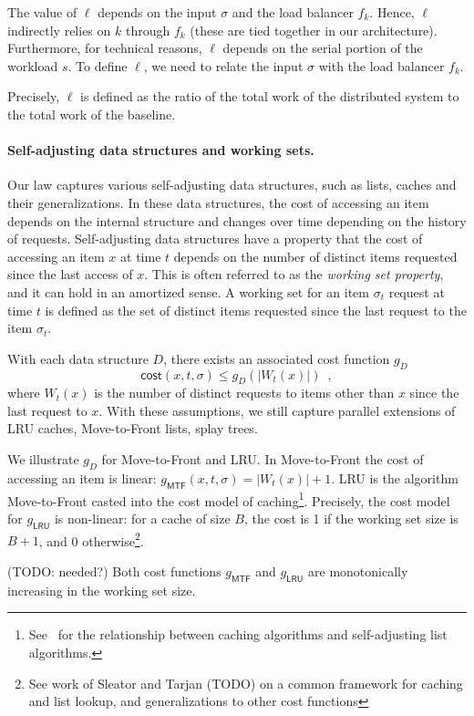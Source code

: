 The value of $\ell$ depends on the input $\sigma$ and the load balancer $f_k$. Hence, $\ell$ indirectly relies on $k$ through $f_k$ (these are tied together in our architecture). Furthermore, for technical reasons, $\ell$ depends on the serial portion of the workload $s$.
To define $\ell$, we need to relate the input $\sigma$ with the load balancer $f_k$.


Precisely, $\ell$ is defined as the ratio of the total work of the distributed system to the total work of the baseline.

\paragraph*{Self-adjusting data structures and working sets.}
Our law captures various self-adjusting data structures, such as lists, caches and their generalizations.
In these data structures, the cost of accessing an item depends on the internal structure and changes over time depending on the history of requests.
Self-adjusting data structures have a property that the cost of accessing an item $x$ at time $t$ depends on the number of distinct items requested since the last access of $x$.
This is often referred to as the \emph{working set property}, and it can hold in an amortized sense.
A working set for an item $\sigma_t$ request at time $t$ is defined as the set of distinct items requested since the last request to the item $\sigma_t$.

With each data structure $D$, there exists an associated cost function $g_D$ 
\[
	\textsf{cost}(x, t, \sigma) \le g_D(|W_t(x)|) \enspace ,
\]
where $W_t(x)$ is the number of distinct requests to items other than $x$ since the last request to $x$.
With these assumptions, we still capture parallel extensions of LRU caches, Move-to-Front lists, splay trees. 

We illustrate $g_D$ for Move-to-Front and LRU. In Move-to-Front the cost of accessing an item is linear: $g_\textsf{MTF}(x,t,\sigma) = |W_t(x)| + 1$.  LRU is the algorithm Move-to-Front casted into the cost model of caching\footnote{See~\cite{SleatorT85} for the relationship between caching algorithms and self-adjusting list algorithms.}. Precisely, the cost model for $g_\textsf{LRU}$ is non-linear: for a cache of size $B$, the cost is 1 if the working set size is $B+1$, and 0 otherwise\footnote{See work of Sleator and Tarjan (TODO) on a common framework for caching and list lookup, and generalizations to other cost functions}.

(TODO: needed?)
Both cost functions $g_\textsf{MTF}$ and $g_\textsf{LRU}$ are monotonically increasing in the working set size.




